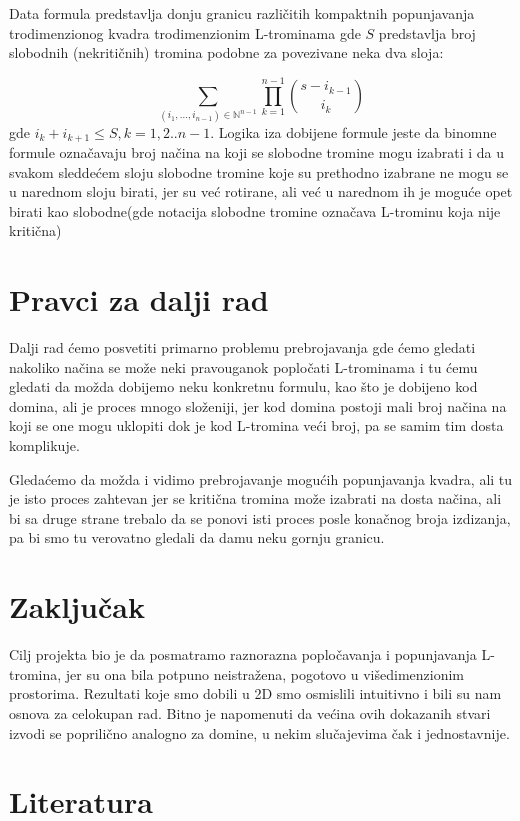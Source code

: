 Data formula predstavlja donju granicu različitih kompaktnih popunjavanja trodimenzionog kvadra trodimenzionim L-trominama gde $S$ predstavlja broj slobodnih (nekritičnih) tromina podobne za povezivane neka dva sloja:

\[
\sum_{(i_1, \dots, i_{n-1}) \in \mathbb{N}^{n-1}} \prod_{k=1}^{n-1} \binom{s - i_{k-1}}{i_k}
\]
gde $i_{k} + i_{k+1} \le S, k=1,2..n-1$.
Logika iza dobijene formule jeste da binomne formule označavaju broj načina na koji se slobodne tromine mogu izabrati i da u svakom sleddećem sloju slobodne tromine koje su prethodno izabrane ne mogu se u narednom sloju birati, jer su već rotirane, ali već u narednom ih je moguće opet birati kao slobodne(gde notacija slobodne tromine označava L-trominu koja nije kritična)



\section{Pravci za dalji rad}

Dalji rad ćemo posvetiti primarno problemu prebrojavanja gde ćemo gledati nakoliko načina se može neki pravouganok popločati L-trominama i tu ćemu gledati da možda dobijemo neku konkretnu formulu, kao što je dobijeno kod domina, ali je proces mnogo složeniji, jer kod domina postoji mali broj načina na koji se one mogu uklopiti dok je kod L-tromina veći broj, pa se samim tim dosta komplikuje.

Gledaćemo da možda i vidimo prebrojavanje mogućih popunjavanja kvadra, ali tu je isto proces zahtevan jer se kritična tromina može izabrati na dosta načina, ali bi sa druge strane trebalo da se ponovi isti proces posle konačnog broja izdizanja, pa bi smo tu verovatno gledali da damu neku gornju granicu.


\section{Zaključak}

Cilj projekta bio je da posmatramo raznorazna popločavanja i popunjavanja L-tromina, jer su ona bila potpuno neistražena, pogotovo u višedimenzionim prostorima. Rezultati koje smo dobili u 2D smo osmislili intuitivno i bili su nam osnova za celokupan rad. Bitno je napomenuti da većina ovih dokazanih stvari izvodi se poprilično analogno za domine, u nekim slučajevima čak i jednostavnije.


\section{Literatura}

\EndPaper

